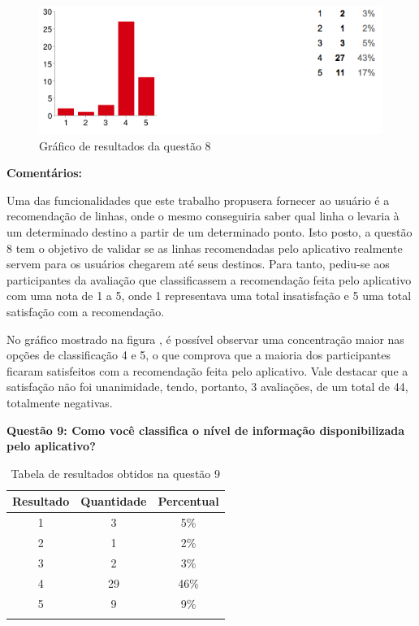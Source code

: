 \begin{figure}[h]
\begin{center}
  \includegraphics[width=16cm]{images/graficos/questao8.png}
  \caption{Gráfico de resultados da questão 8}
  \label{fig:questao8}
\end{center}
\end{figure}

\textbf{Comentários:}

Uma das funcionalidades que este trabalho propusera fornecer ao usuário é a recomendação de linhas, onde o mesmo conseguiria saber qual linha o levaria à um determinado destino a partir de um determinado ponto. Isto posto, a questão 8 tem o objetivo de validar se as linhas recomendadas pelo aplicativo realmente  servem para os usuários  chegarem até seus destinos. Para tanto, pediu-se aos participantes da avaliação que classificassem a recomendação feita pelo aplicativo com uma nota de 1 a 5, onde 1 representava uma total insatisfação e 5 uma total satisfação com a recomendação.

No gráfico mostrado na figura , é possível observar uma concentração maior nas opções de classificação 4 e 5, o que comprova que a maioria dos participantes ficaram satisfeitos com a recomendação feita pelo aplicativo. Vale destacar que a satisfação não foi unanimidade, tendo, portanto, 3 avaliações, de um total  de 44, totalmente negativas. \newline

\textbf{Questão 9: Como você classifica o nível de informação disponibilizada pelo aplicativo?}

\begin{center}
\begin{longtable}{c|c|c}
\hline
    \multicolumn{1}{c}{\textbf{Resultado}} & \multicolumn{1}{c}{\textbf{Quantidade}} & \multicolumn{1}{c}{\textbf{Percentual}} \\
\hline
    1 & 3 &  5\%\\
    \hline
    2 & 1 & 2\%\\
    \hline
    3 & 2 &  3\%\\
    \hline
    4 & 29 & 46\%\\
    \hline
    5 & 9 & 9\%\\
    \hline
\caption{Tabela de resultados obtidos na questão 9}
\label{tabq9}
\end{longtable}
\end{center}


